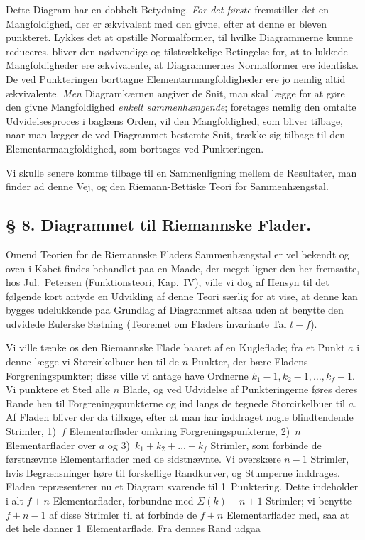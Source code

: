 \documentclass{article}
\begin{document}
Dette Diagram har en dobbelt Betydning. \emph{For det første} fremstiller det en Mangfoldighed, der er ækvivalent med den givne, efter at denne er bleven punkteret. Lykkes det at opstille Normalformer, til hvilke Diagrammerne kunne reduceres, bliver den nødvendige og tilstrækkelige Betingelse for, at to lukkede Mangfoldigheder ere ækvivalente, at Diagrammernes Normalformer ere identiske. De ved Punkteringen borttagne Elementarmangfoldigheder ere jo nemlig altid ækvivalente. \emph{Men} Diagramkærnen angiver de Snit, man skal lægge for at gøre den givne Mangfoldighed \emph{enkelt sammenhængende}; foretages nemlig den omtalte Udvidelsesproces i baglæns Orden, vil den Mangfoldighed, som bliver tilbage, naar man lægger de ved Diagrammet bestemte Snit, trække sig tilbage til den Elementarmangfoldighed, som borttages ved Punkteringen.

Vi skulle senere komme tilbage til en Sammenligning mellem de Resultater, man finder ad denne Vej, og den Riemann-Bettiske Teori for Sammenhængstal.

\subsection*{§ 8. Diagrammet til Riemannske Flader.}

Omend Teorien for de Riemannske Fladers Sammenhængstal er vel bekendt og oven i Købet findes behandlet paa en Maade, der meget ligner den her fremsatte, hos Jul.~Petersen (Funktionsteori, Kap.\ IV), ville vi dog af Hensyn til det følgende kort antyde en Udvikling af denne Teori særlig for at vise, at denne kan bygges udelukkende paa Grundlag af Diagrammet altsaa uden at benytte den udvidede Eulerske Sætning (Teoremet om Fladers invariante Tal $t - f$).

Vi ville tænke os den Riemannske Flade baaret af en Kugleflade; fra et Punkt $a$ i denne lægge vi Storcirkelbuer hen til de $n$ Punkter, der bære Fladens Forgreningspunkter; disse ville vi antage have Ordnerne $k_1 - 1, k_2 - 1, \dots, k_f - 1$. Vi punktere et Sted alle $n$ Blade, og ved Udvidelse af Punkteringerne føres deres Rande hen til Forgreningspunkterne og ind langs de tegnede Storcirkelbuer til $a$. Af Fladen bliver der da tilbage, efter at man har inddraget nogle blindtendende Strimler, 1)~$f$ Elementarflader omkring Forgreningspunkterne, 2)~$n$ Elementarflader over $a$ og 3)~$k_1 + k_2 + \dots + k_f$ Strimler, som forbinde de førstnævnte Elementarflader med de sidstnævnte. Vi overskære $n - 1$ Strimler, hvis Begrænsninger høre til forskellige Randkurver, og Stumperne inddrages. Fladen repræsenterer nu et Diagram svarende til 1~Punktering. Dette indeholder i alt $f + n$ Elementarflader, forbundne med $\Sigma(k) - n + 1$ Strimler; vi benytte $f + n - 1$ af disse Strimler til at forbinde de $f + n$ Elementarflader med, saa at det hele danner 1~Elementarflade. Fra dennes Rand udgaa
\end{document}
